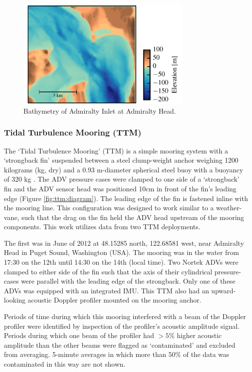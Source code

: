 \documentclass[twocol]{ametsoc}
\begin{document}
\begin{figure}[t]
  \centering
  \includegraphics[width=3.4in]{map04.pdf}
  \caption{Bathymetry of Admiralty Inlet at Admiralty Head.}
  \label{fig:map}
\end{figure}

\subsubsection{Tidal Turbulence Mooring (TTM)}

The `Tidal Turbulence Mooring' (TTM) is a simple mooring system with a `strongback fin' suspended between a steel clump-weight anchor weighing 1200 kilograms (kg, dry) and a 0.93 m-diameter spherical steel buoy with a buoyancy of 320 kg . The ADV pressure cases were clamped to one side of a `strongback' fin and the ADV sensor head was positioned 10cm in front of the fin's leading edge (Figure \ref{fig:ttm:diagram}). The leading edge of the fin is fastened inline with the mooring line. This configuration  was designed to work similar to a weather-vane, such that the drag on the fin held the ADV head upstream of the mooring components.  This work utilizes data from two TTM deployments. 

The first was in June of 2012 at 48.15285 north, 122.68581 west, near Admiralty Head in Puget Sound, Washington (USA). The mooring was in the water from 17:30 on the 12th until 14:30 on the 14th (local time). Two Nortek ADVs were clamped to either side of the fin such that the axis of their cylindrical pressure-cases were parallel with the leading edge of the strongback. Only one of these ADVs was equipped with an integrated IMU. This TTM also had an upward-looking acoustic Doppler profiler mounted on the mooring anchor.

Periods of time during which this mooring interfered with a beam of the Doppler profiler were identified by inspection of the profiler's acoustic amplitude signal. Periods during which one beam of the profiler had $>5\%$ higher acoustic amplitude than the other beams were flagged as `contaminated' and excluded from averaging.  5-minute averages in which more than 50\% of the data was contaminated in this way are not shown.
\end{document}
